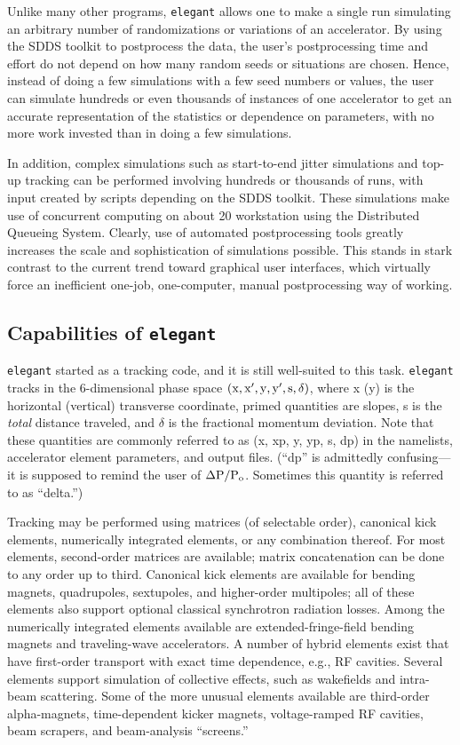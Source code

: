 \documentclass[11pt]{article}
\begin{document}
Unlike many other programs, {\tt elegant} allows one to make a single
run simulating an arbitrary number of randomizations or variations of
an accelerator.  By using the SDDS toolkit to postprocess the data,
the user's postprocessing time and effort do not depend on how many
random seeds or situations are chosen.  Hence, instead of doing a few
simulations with a few seed numbers or values, the user can simulate
hundreds or even thousands of instances of one accelerator to get an
accurate representation of the statistics or dependence on parameters,
with no more work invested than in doing a few simulations.

In addition, complex simulations such as start-to-end jitter
simulations\cite{S2EJitter} and top-up tracking\cite{TopUpTracking}
can be performed involving hundreds or thousands of runs, with input
created by scripts depending on the SDDS toolkit.  These simulations
make use of concurrent computing on about 20 workstation using the
Distributed Queueing System\cite{DQS}.  Clearly, use of automated
postprocessing tools greatly increases the scale and sophistication of
simulations possible.  This stands in stark contrast to the current
trend toward graphical user interfaces, which virtually force an
inefficient one-job, one-computer, manual postprocessing way of
working.

\subsection{Capabilities of {\tt elegant}}

{\tt elegant} started as a tracking code, and it is still well-suited
to this task.  {\tt elegant} tracks in the 6-dimensional phase space
${\rm (x, x^\prime, y, y^\prime, s, \delta)}$, where x (y) is the
horizontal (vertical) transverse coordinate, primed quantities are
slopes, s is the {\em total} distance traveled, and $\delta$ is the
fractional momentum deviation\cite{KLBrown}.  Note that these
quantities are commonly referred to as (x, xp, y, yp, s, dp) in the
namelists, accelerator element parameters, and output files.  (``dp''
is admittedly confusing---it is supposed to remind the user of ${\rm
\Delta P/P_o}$.  Sometimes this quantity is referred to as ``delta.'')

Tracking may be performed using matrices (of selectable order),
canonical kick elements, numerically integrated elements, or any
combination thereof.  For most elements, second-order matrices are
available; matrix concatenation can be done to any order up to third.
Canonical kick elements are available for bending magnets,
quadrupoles, sextupoles, and higher-order multipoles; all of these
elements also support optional classical synchrotron radiation losses.
Among the numerically integrated elements available are
extended-fringe-field bending magnets and traveling-wave accelerators.
A number of hybrid elements exist that have first-order transport with
exact time dependence, e.g., RF cavities.  Several elements support
simulation of collective effects, such as wakefields and intra-beam
scattering.  Some of the more unusual elements available are
third-order alpha-magnets\cite{Borland_thesis,Enge}, time-dependent
kicker magnets, voltage-ramped RF cavities, beam scrapers, and
beam-analysis ``screens.''
\end{document}
